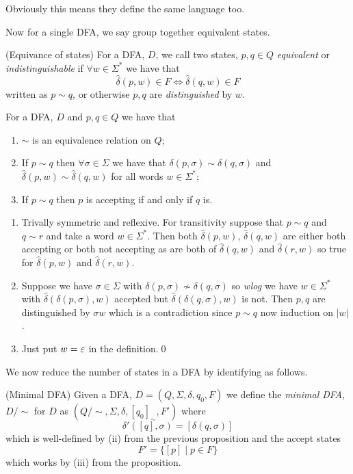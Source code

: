 \documentclass[tikx, border = 10pt]{article}
\begin{document}
\begin{remark}
  Obviously this means they define the same language too.
\end{remark}
Now for a single DFA, we say group together equivalent states.
\begin{definition}
(Equivance of states) For a DFA, $ D $, we call two states, $ p,q\in Q $ \textit{equivalent} or \textit{indistinguishable} if $\forall w \in \Sigma^* $ we have that
\[
  \hat \delta(p,w)\in F \iff \hat\delta(q,w)\in F
\]
written as $ p\sim q $, or otherwise $ p,q $ are \textit{distinguished} by $ w $.
\end{definition}
\begin{proposition}
  For a DFA, $ D $ and $ p,q\in Q $ we have that
  \begin{enumerate}
	  \item $ \sim $ is an equivalence relation on $ Q $;
	  \item If $ p\sim q $ then $ \forall\sigma \in \Sigma $ we have that $ \delta(p,\sigma) \sim\delta(q,\sigma) $ and $ \hat\delta(p,w)\sim\hat\delta(q,w) $ for all words $ w\in \Sigma^* $;
	  \item If $ p\sim q $ then $ p $ is accepting if and only if $ q $ is.
  \end{enumerate}
\end{proposition}
\pf\par
\begin{enumerate}
	\item Trivally symmetric and reflexive. For transitivity suppose that $ p\sim q $ and $ q\sim r $ and take a word $ w\in \Sigma^* $. Then both $ \hat\delta(p,w) $, $ \hat\delta(q,w) $ are either both accepting or both not accepting as are both of $ \hat \delta(q,w) $ and $ \hat\delta(r,w) $ so true for $ \hat\delta(p,w) $ and $ \hat\delta(r,w) $.
	\item Suppose we have $ \sigma \in \Sigma $ with $ \delta(p,\sigma)\not\sim \delta(q,\sigma) $ so \textit{wlog} we have $ w\in \Sigma^* $ with $ \hat\delta(\delta(p,\sigma),w) $ accepted but $ \hat\delta(\delta(q,\sigma),w) $ is not. Then $ p,q $ are distinguished by $ \sigma w $ which is a contradiction since $ p\sim q $ now induction on $ |w| $.
	\item Just put $ w=\varepsilon $ in the definition.\qed
\end{enumerate}
We now reduce the number of states in a DFA by identifying as follows.
\begin{definition}
	(Minimal DFA) Given a DFA, $ D = (Q,\Sigma,\delta, q_0,F) $ we define the \textit{minimal DFA}, $ D/\sim $ for $ D $ as $ (Q/\sim, \Sigma, \delta, [q_0]_\sim, F') $ where
	\[
		\delta'([q],\sigma) = [\delta(q,\sigma)]
	\]
	which is well-defined by (ii) from the previous proposition and the accept states
	\[
		F' = \{[p] \mid p \in F\}
	\]
	which works by (iii) from the proposition.
\end{definition}
\end{document}

